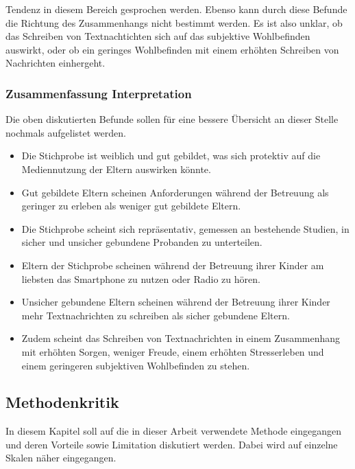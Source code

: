 Tendenz in diesem Bereich gesprochen werden. Ebenso kann durch diese Befunde die Richtung des Zusammenhangs nicht bestimmt werden. Es ist also unklar, ob das Schreiben von Textnachtichten sich auf das subjektive Wohlbefinden auswirkt, oder ob ein geringes Wohlbefinden mit einem erhöhten Schreiben von Nachrichten einhergeht.  


\subsubsection{Zusammenfassung Interpretation}
Die oben diskutierten Befunde sollen für eine bessere Übersicht an dieser Stelle nochmals aufgelistet werden.
\begin{itemize}
    \item Die Stichprobe ist weiblich und gut gebildet, was sich protektiv auf die Mediennutzung der Eltern auswirken könnte.
    
    \item Gut gebildete Eltern scheinen Anforderungen während der Betreuung als geringer zu erleben als weniger gut gebildete Eltern.
    
    \item Die Stichprobe scheint sich repräsentativ, gemessen an bestehende Studien, in sicher und unsicher gebundene Probanden zu unterteilen.
    
    \item Eltern der Stichprobe scheinen während der Betreuung ihrer Kinder am liebsten das Smartphone zu nutzen oder Radio zu hören.
    
    \item Unsicher gebundene Eltern scheinen während der Betreuung ihrer Kinder mehr Textnachrichten zu schreiben als sicher gebundene Eltern. 
    
    \item Zudem scheint das Schreiben von Textnachrichten in einem Zusammenhang mit erhöhten Sorgen, weniger Freude, einem erhöhten Stresserleben und einem geringeren subjektiven Wohlbefinden zu stehen. 
\end{itemize}


\subsection{Methodenkritik} \label{sec:Methodenkritik}
In diesem Kapitel soll auf die in dieser Arbeit verwendete Methode eingegangen  und deren Vorteile sowie Limitation diskutiert werden. Dabei wird auf einzelne Skalen näher eingegangen.

